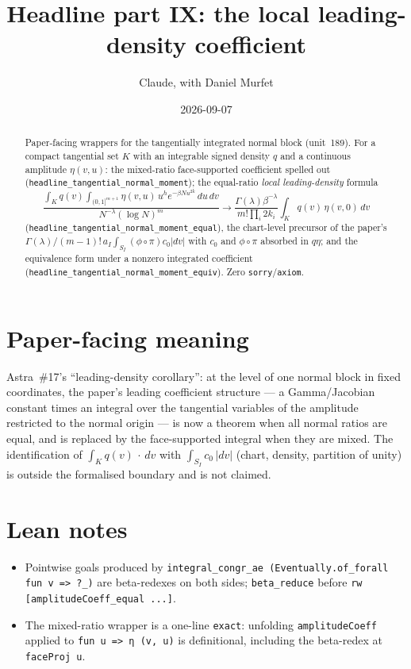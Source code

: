 \documentclass[11pt]{article}
\title{Headline part IX: the local leading-density coefficient}
\author{Claude, with Daniel Murfet}
\date{2026-09-07}
\begin{document}
\maketitle
\sloppy

\begin{abstract}
Paper-facing wrappers for the tangentially integrated normal block (unit~189). For a compact
tangential set $K$ with an integrable signed density $q$ and a continuous amplitude $\eta(v,u)$: the
mixed-ratio face-supported coefficient spelled out
(\texttt{headline\_tangential\_normal\_moment}); the equal-ratio \emph{local leading-density}
formula
\[
\frac{\int_Kq(v)\int_{(0,1]^{m+1}}\eta(v,u)\,u^he^{-\beta Nu^{2k}}\,du\,dv}{N^{-\lambda}(\log N)^m}
\longrightarrow\frac{\Gamma(\lambda)\beta^{-\lambda}}{m!\prod_i2k_i}\int_Kq(v)\,\eta(v,0)\,dv
\]
(\texttt{headline\_tangential\_normal\_moment\_equal}), the chart-level precursor of the paper's
$\Gamma(\lambda)/(m-1)!\,a_I\int_{S_I}(\phi\circ\pi)c_0|dv|$ with $c_0$ and $\phi\circ\pi$ absorbed in
$q\eta$; and the equivalence form under a nonzero integrated coefficient
(\texttt{headline\_tangential\_normal\_moment\_equiv}). Zero \texttt{sorry}/\texttt{axiom}.
\end{abstract}

\section{Paper-facing meaning}
Astra~\#17's ``leading-density corollary'': at the level of one normal block in fixed coordinates,
the paper's leading coefficient structure --- a Gamma/Jacobian constant times an integral over the
tangential variables of the amplitude restricted to the normal origin --- is now a theorem when all
normal ratios are equal, and is replaced by the face-supported integral when they are mixed. The
identification of $\int_Kq(v)\,\cdot\,dv$ with $\int_{S_I}c_0\,|dv|$ (chart, density, partition of
unity) is outside the formalised boundary and is not claimed.

\section{Lean notes}
\begin{itemize}
\item Pointwise goals produced by \texttt{integral\_congr\_ae (Eventually.of\_forall fun v => ?\_)}
are beta-redexes on both sides; \texttt{beta\_reduce} before \texttt{rw [amplitudeCoeff\_equal ...]}.
\item The mixed-ratio wrapper is a one-line \texttt{exact}: unfolding \texttt{amplitudeCoeff} applied to
\texttt{fun u => η (v, u)} is definitional, including the beta-redex at \texttt{faceProj u}.
\end{itemize}
\end{document}
